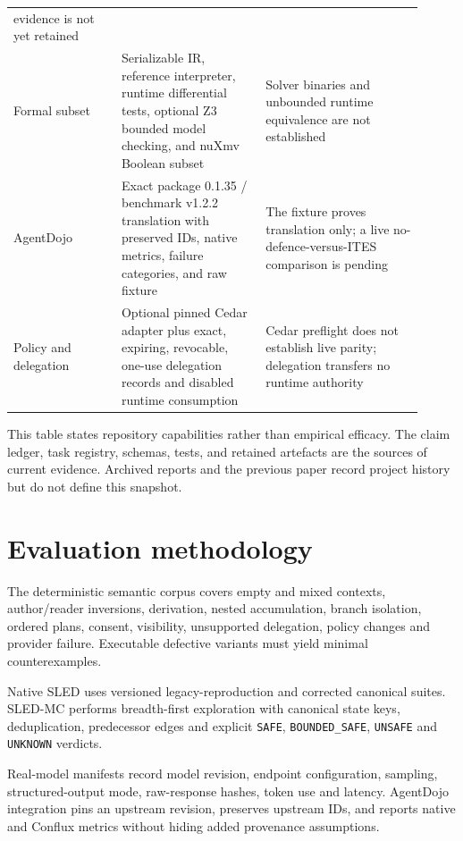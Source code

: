 \documentclass[11pt]{article}
\begin{document}
\begin{tabular}{p{0.24\linewidth}p{0.32\linewidth}p{0.35\linewidth}}
evidence is not yet retained \\
Formal subset & Serializable IR, reference interpreter, runtime differential
tests, optional Z3 bounded model checking, and nuXmv Boolean subset & Solver
binaries and unbounded runtime equivalence are not established \\
AgentDojo & Exact package 0.1.35 / benchmark v1.2.2 translation with preserved
IDs, native metrics, failure categories, and raw fixture & The fixture proves
translation only; a live no-defence-versus-ITES comparison is pending \\
Policy and delegation & Optional pinned Cedar adapter plus exact, expiring,
revocable, one-use delegation records and disabled runtime consumption & Cedar
preflight does not establish live parity; delegation transfers no runtime
authority \\
\bottomrule
\end{tabular}

This table states repository capabilities rather than empirical efficacy. The
claim ledger, task registry, schemas, tests, and retained artefacts are the
sources of current evidence. Archived reports and the previous paper record
project history but do not define this snapshot.

\section{Evaluation methodology}
The deterministic semantic corpus covers empty and mixed contexts,
author/reader inversions, derivation, nested accumulation, branch isolation,
ordered plans, consent, visibility, unsupported delegation, policy changes and
provider failure. Executable defective variants must yield minimal
counterexamples.

Native SLED uses versioned legacy-reproduction and corrected canonical suites.
SLED-MC performs breadth-first exploration with canonical state keys,
deduplication, predecessor edges and explicit \texttt{SAFE},
\texttt{BOUNDED\_SAFE}, \texttt{UNSAFE} and \texttt{UNKNOWN} verdicts.

Real-model manifests record model revision, endpoint configuration, sampling,
structured-output mode, raw-response hashes, token use and latency. AgentDojo
integration pins an upstream revision, preserves upstream IDs, and reports
native and Conflux metrics without hiding added provenance assumptions.
\end{document}
